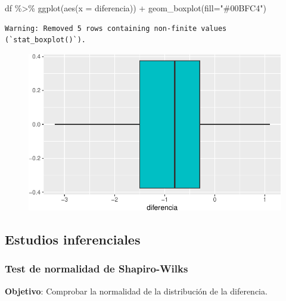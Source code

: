 \documentclass[
  a4paper,
]{scrreport}
\newenvironment{Shaded}{\begin{snugshade}}{\end{snugshade}}
\newcommand{\AttributeTok}[1]{\textcolor[rgb]{0.40,0.45,0.13}{#1}}
\newcommand{\FunctionTok}[1]{\textcolor[rgb]{0.28,0.35,0.67}{#1}}
\newcommand{\NormalTok}[1]{\textcolor[rgb]{0.00,0.23,0.31}{#1}}
\newcommand{\SpecialCharTok}[1]{\textcolor[rgb]{0.37,0.37,0.37}{#1}}
\newcommand{\StringTok}[1]{\textcolor[rgb]{0.13,0.47,0.30}{#1}}
\theoremstyle{definition}
\theoremstyle{definition}
\theoremstyle{remark}
\begin{document}
\begin{Shaded}
\begin{Highlighting}[]
\NormalTok{df }\SpecialCharTok{\%\textgreater{}\%} \FunctionTok{ggplot}\NormalTok{(}\FunctionTok{aes}\NormalTok{(}\AttributeTok{x =}\NormalTok{ diferencia)) }\SpecialCharTok{+} 
  \FunctionTok{geom\_boxplot}\NormalTok{(}\AttributeTok{fill=}\StringTok{"\#00BFC4"}\NormalTok{)}
\end{Highlighting}
\end{Shaded}

\begin{verbatim}
Warning: Removed 5 rows containing non-finite values (`stat_boxplot()`).
\end{verbatim}

\begin{figure}[H]

{\centering \includegraphics{./08-analisis-estadisticos_files/figure-pdf/unnamed-chunk-40-1.pdf}

}

\end{figure}

\hypertarget{estudios-inferenciales-3}{%
\subsection{Estudios inferenciales}\label{estudios-inferenciales-3}}

\hypertarget{test-de-normalidad-de-shapiro-wilks-1}{%
\subsubsection{Test de normalidad de
Shapiro-Wilks}\label{test-de-normalidad-de-shapiro-wilks-1}}

\textbf{Objetivo}: Comprobar la normalidad de la distribución de la
diferencia.
\end{document}
